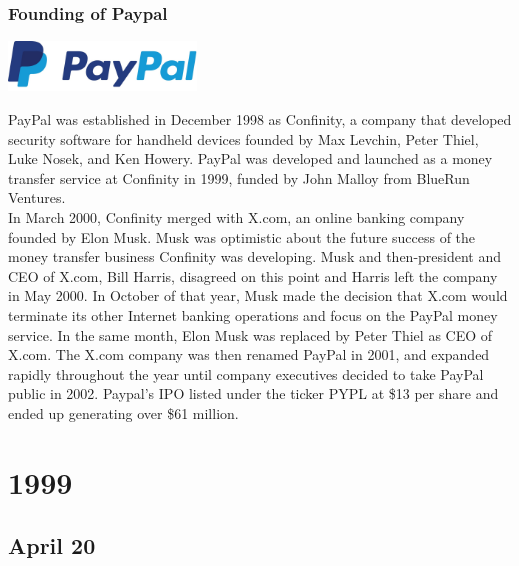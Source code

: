 \documentclass[11pt]{report}
\begin{document}
\subsection{Founding of Paypal}
\vspace{2mm}\begin{center}\includegraphics[width=5cm]{./img/paypalLogo.jpg}\end{center}
PayPal was established in December 1998 as Confinity, a company that developed security software for handheld devices founded by Max Levchin, Peter Thiel, Luke Nosek, and Ken Howery. PayPal was developed and launched as a money transfer service at Confinity in 1999, funded by John Malloy from BlueRun Ventures.\\ \indent In March 2000, Confinity merged with X.com, an online banking company founded by Elon Musk. Musk was optimistic about the future success of the money transfer business Confinity was developing. Musk and then-president and CEO of X.com, Bill Harris, disagreed on this point and Harris left the company in May 2000. In October of that year, Musk made the decision that X.com would terminate its other Internet banking operations and focus on the PayPal money service. In the same month, Elon Musk was replaced by Peter Thiel as CEO of X.com. The X.com company was then renamed PayPal in 2001, and expanded rapidly throughout the year until company executives decided to take PayPal public in 2002. Paypal's IPO listed under the ticker PYPL at \$13 per share and ended up generating over \$61 million.

\chapter{1999}
\section{April 20}
\end{document}
